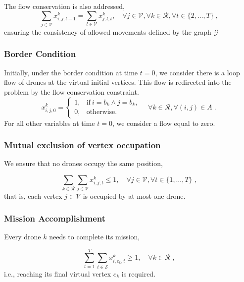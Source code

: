  The flow conservation is also addressed,  \begin{equation}\label{eq:restr_fluxo}
\sum_{j \in \mathcal{V}} x_{i,j,t-1}^{k} =
\sum_{l \in \mathcal{V}} x_{j,l,t}^{k}, \quad
\forall j \in \mathcal{V}, \forall k \in \mathcal{R}, \forall t \in \{2, \ldots, T\} \; \text{,}
\end{equation} ensuring the consistency of allowed movements defined by the graph $\mathcal{G}$

\subsubsection{Border Condition}

Initially, under the border condition at time $t=0$, we consider there is a loop flow of drones at the virtual initial vertices.
This flow is redirected into the problem by the flow conservation constraint. \begin{equation}\label{eq:restr_borda}
    x_{i,j,0}^k = \left\{
    \begin{matrix}
        1, & \text{if}\ i=b_k \land j=b_k,\\
        0, & \text{otherwise}.
    \end{matrix}
    \right.
    \quad \forall k \in \mathcal{R}, \forall (i,j) \in A  \; \text{.}
\end{equation} For all other variables at time $t=0$, we consider a flow equal to zero.

\subsubsection{Mutual exclusion of vertex occupation}

We ensure that no drones occupy the same position,

\begin{equation}\label{eq:restr_ocupacao}
\sum_{k \in \mathcal{R}}
\sum_{j \in \mathcal{V}}
x_{i,j,t}^{k} \leq 1, \quad \forall j \in \mathcal{V}, \forall t \in \{1, \ldots, T\} \; \text{,}
\end{equation} that is, each vertex $j \in \mathcal{V}$ is occupied by at most one drone.

\subsubsection{Mission Accomplishment}

Every drone $k$ needs to complete its mission, 

\begin{equation}\label{eq:restr_fim}
\sum_{t=1}^{T}
\sum_{i \in \mathcal{S}}
x_{i,e_k,t}^k \geq 1, \quad \forall k \in \mathcal{R} \; \text{,}
\end{equation} i.e., reaching its final virtual vertex $e_k$ is required.
